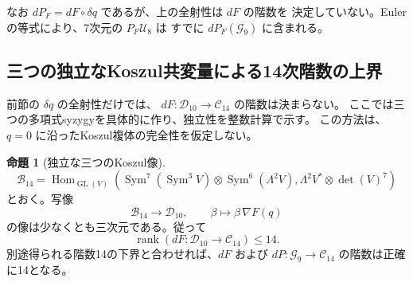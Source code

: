 \documentclass[a4paper,11pt]{ltjsarticle}
\theoremstyle{definition}
\newtheorem{proposition}[theorem]{命題}
\begin{document}
なお $dP_F=dF\circ\delta q$ であるが、上の全射性は $dF$ の階数を
決定していない。Eulerの等式により、7次元の $P_F\mathcal U_8$ は
すでに $dP_F(\mathcal G_9)$ に含まれる。

\subsection{三つの独立なKoszul共変量による14次階数の上界}
\label{subsec:v11-koszul-three-syzygies}

前節の $\delta q$ の全射性だけでは、
$dF:\mathcal D_{10}\to\mathcal C_{14}$ の階数は決まらない。
ここでは三つの多項式syzygyを具体的に作り、独立性を整数計算で示す。
この方法は、$q=0$ に沿ったKoszul複体の完全性を仮定しない。

\begin{proposition}[独立な三つのKoszul像]
\label{prop:v11-three-koszul-images}
\[
 \mathcal B_{14}=
 \operatorname{Hom}_{\operatorname{GL}(V)}
 \left(\operatorname{Sym}^7(\operatorname{Sym}^3V)
       \otimes\operatorname{Sym}^6(\Lambda^2V),
       \Lambda^2V^*\otimes\det(V)^7\right)
\]
とおく。写像
\[
 \mathcal B_{14}\longrightarrow\mathcal D_{10},
 \qquad \beta\longmapsto\beta\,\nabla F(q)
\]
の像は少なくとも三次元である。従って
\[
 \operatorname{rank}(dF:\mathcal D_{10}\to\mathcal C_{14})\le14.
\]
別途得られる階数14の下界と合わせれば、$dF$ および
$dP:\mathcal G_9\to\mathcal C_{14}$ の階数は正確に14となる。
\end{proposition}
\end{document}

